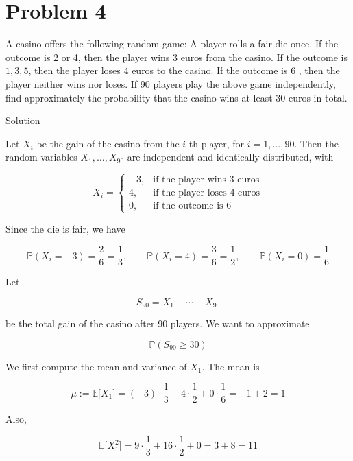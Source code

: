 \section{Problem 4}\label{hw06-problem-4}

A casino offers the following random game: A player rolls a fair die once. If the outcome is 2 or 4, then the player wins 3 euros from the casino. If the outcome is \(1,3,5\), then the player loses 4 euros to the casino. If the outcome is 6 , then the player neither wins nor loses. If 90 players play the above game independently, find approximately the probability that the casino wins at least 30 euros in total.

\begin{qlsolution}{Solution}

Let \(\mathit{X}_{\mathit{i}}\) be the gain of the casino from the \(\mathit{i}\)-th player, for \(\mathit{i} = 1,\ldots,90\). Then the random variables \(\mathit{X}_{1},\ldots,\mathit{X}_{90}\) are independent and identically distributed, with

\[\mathit{X}_{\mathit{i}} = \left\{ \begin{matrix}
{- 3,} & \text{if the player wins 3 euros} \\
{4,} & \text{if the player loses 4 euros} \\
{0,} & \text{if the outcome is 6}
\end{matrix} \right.\]

Since the die is fair, we have

\[\mathbb{P}(\mathit{X}_{\mathit{i}} = - 3) = \frac{2}{6} = \frac{1}{3},\qquad\mathbb{P}(\mathit{X}_{\mathit{i}} = 4) = \frac{3}{6} = \frac{1}{2},\qquad\mathbb{P}(\mathit{X}_{\mathit{i}} = 0) = \frac{1}{6}\]

Let

\[\mathit{S}_{90} = \mathit{X}_{1} + \cdots + \mathit{X}_{90}\]

be the total gain of the casino after 90 players. We want to approximate

\[\mathbb{P}(\mathit{S}_{90} \geq 30)\]

We first compute the mean and variance of \(\mathit{X}_{1}\). The mean is

\[\mathit{\mu} := \mathbb{E}\lbrack\mathit{X}_{1}\rbrack = ( - 3) \cdot \frac{1}{3} + 4 \cdot \frac{1}{2} + 0 \cdot \frac{1}{6} = - 1 + 2 = 1\]

Also,

\[\mathbb{E}\lbrack\mathit{X}_{1}^{2}\rbrack = 9 \cdot \frac{1}{3} + 16 \cdot \frac{1}{2} + 0 = 3 + 8 = 11\]


\end{qlsolution}
